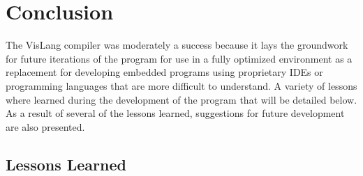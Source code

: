 \section{Conclusion}

The VisLang compiler was moderately a success because it lays the groundwork for future
iterations of the program for use in a fully optimized environment as a replacement for
developing embedded programs using proprietary IDEs or programming languages that are
more difficult to understand. A variety of lessons where learned during the development
of the program that will be detailed below. As a result of several of the lessons learned,
suggestions for future development are also presented.

\subsection{Lessons Learned}

